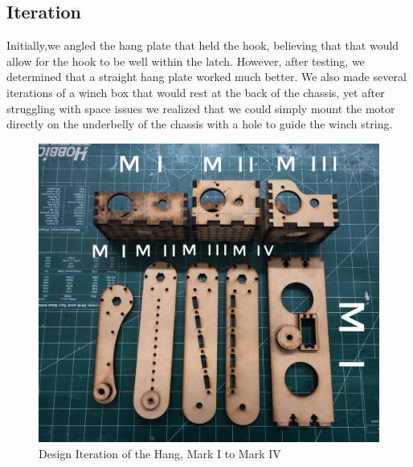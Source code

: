 \subsection*{Iteration}
Initially,we angled the hang plate that held the hook, believing that that would allow for the hook to be well within the latch. However, after testing, we determined that a straight hang plate worked much better. We also made several iterations of a winch box that would rest at the back of the chassis, yet after struggling with space issues we realized that we could simply mount the motor directly on the underbelly of the chassis with a hole to guide the winch string.

\begin{figure}[htp]
\centering
\includegraphics[width=.8\linewidth]{Design_Overview/Hang_Iteration.jpg}
\caption{Design Iteration of the Hang, Mark I to Mark IV}
\label{fig:hang_iteration}
\end{figure}


